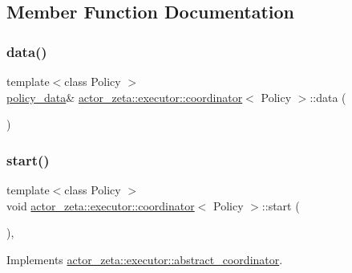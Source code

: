 \subsection{Member Function Documentation}
\mbox{\label{classactor__zeta_1_1executor_1_1coordinator_a2e94e1b65d78e6c0b0e2861c9b679ddf}} 
\subsubsection{\texorpdfstring{data()}{data()}}
{\footnotesize\ttfamily template$<$class Policy $>$ \\
\hyperlink{classactor__zeta_1_1executor_1_1coordinator_a81ac6921473ebffdc2a20df32249dbcc}{policy\+\_\+data}\& \hyperlink{classactor__zeta_1_1executor_1_1coordinator}{actor\+\_\+zeta\+::executor\+::coordinator}$<$ Policy $>$\+::data (\begin{DoxyParamCaption}{ }\end{DoxyParamCaption})\hspace{0.3cm}{\ttfamily [inline]}}

\mbox{\label{classactor__zeta_1_1executor_1_1coordinator_a1b73b7ddd6b48ba3e15b6f710cb21808}} 
\subsubsection{\texorpdfstring{start()}{start()}}
{\footnotesize\ttfamily template$<$class Policy $>$ \\
void \hyperlink{classactor__zeta_1_1executor_1_1coordinator}{actor\+\_\+zeta\+::executor\+::coordinator}$<$ Policy $>$\+::start (\begin{DoxyParamCaption}{ }\end{DoxyParamCaption})\hspace{0.3cm}{\ttfamily [inline]}, {\ttfamily [virtual]}}



Implements \hyperlink{classactor__zeta_1_1executor_1_1abstract__coordinator_abbbe1a84649a3ae2cfcb60c7728b2944}{actor\+\_\+zeta\+::executor\+::abstract\+\_\+coordinator}.


